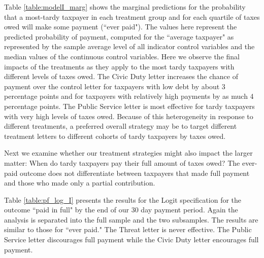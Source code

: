 \documentclass[12pt,titlepage]{article}
\begin{document}
Table \ref{table:modelI_marg} shows the marginal predictions for the probability that
a most-tardy taxpayer in each treatment group and for each quartile of
taxes owed will make some payment (``ever paid").  The values here
represent the predicted probability of payment, computed for the
``average taxpayer" as represented by the sample average level of all
indicator control variables and the median values of the continuous
control variables.  Here we observe the final impacts of the
treatments as they apply to the most tardy taxpayers with different
levels of taxes owed.  The Civic Duty letter increases the chance of
payment over the control letter for taxpayers with low debt by about 3
percentage points and for taxpayers with relatively high payments by
as much 4 percentage points.  The Public Service letter is most
effective for tardy taxpayers with very high levels of taxes owed.
Because of this heterogeneity in response to different treatments, a
preferred overall strategy may be to target different treatment
letters to different cohorts of tardy taxpayers by taxes owed.

Next we examine whether our treatment strategies might also impact the
larger matter: When do tardy taxpayers pay their full amount of taxes
owed?  The ever-paid outcome does not differentiate between taxpayers
that made full payment and those who made only a partial contribution.

Table \ref{table:pf_log_I} presents the results for the Logit specification for
the outcome ``paid in full" by the end of our 30 day payment period.
Again the analysis is separated into the full sample and the
two subsamples.  The results are similar to those for ``ever paid."
The Threat letter is never effective.  The Public Service letter
discourages full payment while the Civic Duty letter encourages full
payment.
\end{document}
